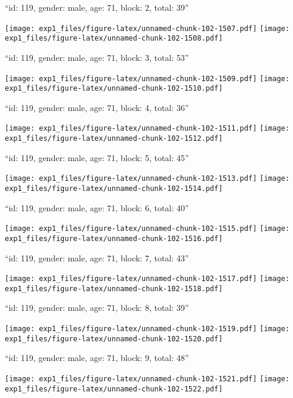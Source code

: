 \documentclass[11pt,,]{article}
\begin{document}
\newpage
[1] 

``id: 119, gender: male, age: 71, block: 2, total: 39''

\texttt{[image: exp1\_files/figure-latex/unnamed-chunk-102-1507.pdf]}
\texttt{[image: exp1\_files/figure-latex/unnamed-chunk-102-1508.pdf]}

\newpage
[1] 

``id: 119, gender: male, age: 71, block: 3, total: 53''

\texttt{[image: exp1\_files/figure-latex/unnamed-chunk-102-1509.pdf]}
\texttt{[image: exp1\_files/figure-latex/unnamed-chunk-102-1510.pdf]}

\newpage
[1] 

``id: 119, gender: male, age: 71, block: 4, total: 36''

\texttt{[image: exp1\_files/figure-latex/unnamed-chunk-102-1511.pdf]}
\texttt{[image: exp1\_files/figure-latex/unnamed-chunk-102-1512.pdf]}

\newpage
[1] 

``id: 119, gender: male, age: 71, block: 5, total: 45''

\texttt{[image: exp1\_files/figure-latex/unnamed-chunk-102-1513.pdf]}
\texttt{[image: exp1\_files/figure-latex/unnamed-chunk-102-1514.pdf]}

\newpage
[1] 

``id: 119, gender: male, age: 71, block: 6, total: 40''

\texttt{[image: exp1\_files/figure-latex/unnamed-chunk-102-1515.pdf]}
\texttt{[image: exp1\_files/figure-latex/unnamed-chunk-102-1516.pdf]}

\newpage
[1] 

``id: 119, gender: male, age: 71, block: 7, total: 43''

\texttt{[image: exp1\_files/figure-latex/unnamed-chunk-102-1517.pdf]}
\texttt{[image: exp1\_files/figure-latex/unnamed-chunk-102-1518.pdf]}

\newpage
[1] 

``id: 119, gender: male, age: 71, block: 8, total: 39''

\texttt{[image: exp1\_files/figure-latex/unnamed-chunk-102-1519.pdf]}
\texttt{[image: exp1\_files/figure-latex/unnamed-chunk-102-1520.pdf]}

\newpage
[1] 

``id: 119, gender: male, age: 71, block: 9, total: 48''

\texttt{[image: exp1\_files/figure-latex/unnamed-chunk-102-1521.pdf]}
\texttt{[image: exp1\_files/figure-latex/unnamed-chunk-102-1522.pdf]}
\end{document}
